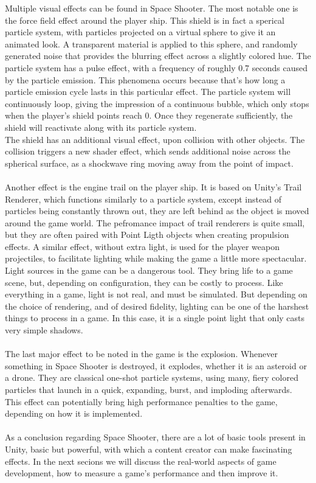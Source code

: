Multiple visual effects can be found in Space Shooter. The most notable one is the force field effect around the player ship. This shield is in fact a sperical particle system, with particles projected on a virtual sphere to give it an animated look. A transparent material is applied to this sphere, and randomly generated noise that provides the blurring effect across a slightly colored hue. The particle system has a pulse effect, with a frequency of roughly 0.7 seconds caused by the particle emission. This phenomena occurs because that's how long a particle emission cycle lasts in this particular effect. The particle system will continuously loop, giving the impression of a continuous bubble, which only stops when the player's shield points reach 0. Once they regenerate sufficiently, the shield will reactivate along with its particle system. \\
The shield has an additional visual effect, upon collision with other objects. The collision triggers a new shader effect, which sends additional noise across the spherical surface, as a shockwave ring moving away from the point of impact. \\ \\
Another effect is the engine trail on the player ship. It is based on Unity's Trail Renderer, which functions similarly to a particle system, except instead of particles being constantly thrown out, they are left behind as the object is moved around the game world. The pefromance impact of trail renderers is quite small, but they are often paired with Point Ligth objects when creating propulsion effects. A similar effect, without extra light, is used for the player weapon projectiles, to facilitate lighting while making the game a little more spectacular.\\
 Light sources in the game can be a dangerous tool. They bring life to a game scene, but, depending on configuration, they can be costly to process. Like everything in a game, light is not real, and must be simulated. But depending on the choice of rendering, and of desired fidelity, lighting can be one of the harshest things to process in a game. In this case, it is a single point light that only casts very simple shadows. \\ \\ 
 The last major effect to be noted in the game is the explosion. Whenever something in Space Shooter is destroyed, it explodes, whether it is an asteroid or a drone. They are classical one-shot particle systems, using many, fiery colored particles that launch in a quick, expanding, burst, and imploding afterwards. This effect can potentially bring high performance penalties to the game, depending on how it is implemented. \\ \\
 As a conclusion regarding Space Shooter, there are a lot of basic tools present in Unity, basic but powerful, with which a content creator can make fascinating effects. In the next secions we will discuss the real-world aspects of game development, how to measure a game's performance and then improve it.